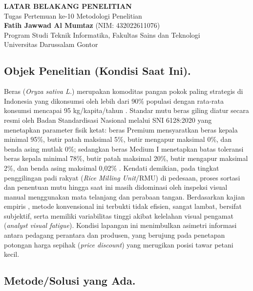 \documentclass[12pt,a4paper]{article}
\begin{document}
\begin{center}
    {\Large\bfseries LATAR BELAKANG PENELITIAN}\\[0.5em]
    {\normalsize Tugas Pertemuan ke-10 Metodologi Penelitian}\\[0.3em]
    {\small\textbf{Fatih Jawwad Al Mumtaz} (NIM: 432022611076)}\\
    {\small Program Studi Teknik Informatika, Fakultas Sains dan Teknologi}\\
    {\small Universitas Darussalam Gontor}
\end{center}
\vspace{1em}

\subsection*{Objek Penelitian (Kondisi Saat Ini).}

\setlength{\parindent}{1.0cm} Beras (\textit{Oryza sativa L.}) merupakan komoditas pangan pokok paling strategis di Indonesia 
yang dikonsumsi oleh lebih dari 90\% populasi dengan rata-rata konsumsi mencapai 95 kg/kapita/tahun \autocite{bps2024}.
Standar mutu beras giling diatur secara resmi oleh Badan Standardisasi Nasional melalui SNI 6128:2020 yang menetapkan parameter fisik ketat: 
beras Premium mensyaratkan beras kepala minimal 95\%, butir patah maksimal 5\%, butir mengapur maksimal 0\%, dan benda asing mutlak 0\%; 
sedangkan beras Medium I menetapkan batas toleransi beras kepala minimal 78\%, butir patah maksimal 20\%, butir mengapur maksimal 2\%,
dan benda asing maksimal 0,02\% \autocite{bsn2020sni}. Kendati demikian, pada tingkat penggilingan padi rakyat 
(\textit{Rice Milling Unit}/RMU) di pedesaan, proses sortasi dan penentuan mutu hingga saat ini masih didominasi 
oleh inspeksi visual manual menggunakan mata telanjang dan perabaan tangan. 
Berdasarkan kajian empiris \textcite{zareiforoush2015}, metode konvensional ini terbukti tidak efisien, 
sangat lambat, bersifat subjektif, serta memiliki variabilitas tinggi akibat kelelahan visual pengamat (\textit{analyst visual fatigue}).
Kondisi lapangan ini menimbulkan asimetri informasi antara pedagang perantara dan produsen, 
yang berujung pada penetapan potongan harga sepihak (\textit{price discount}) yang merugikan posisi tawar petani kecil.

\subsection*{Metode/Solusi yang Ada.} 
\end{document}
